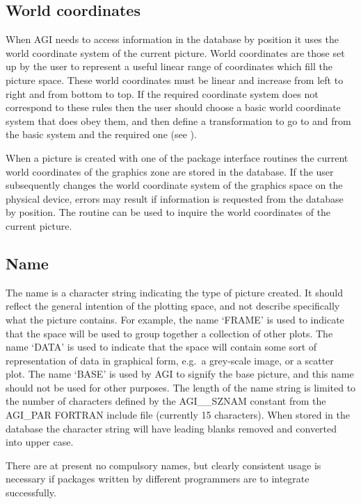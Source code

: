 \documentclass[twoside,11pt,nolof]{starlink}
\begin{document}
\subsection{World coordinates}
When AGI needs to access information in the database by position it uses the
world coordinate system of the current picture.
World coordinates are those set up by the user to represent a useful linear
range of coordinates which fill the picture space.
These world coordinates must be linear and increase from left to right
and from bottom to top. If the required coordinate system does not correspond
to these rules then the user should choose a basic world coordinate system
that does obey them, and then define a transformation to go to and from
the basic system and the required one (see
).

When a picture is created with one of the package interface routines the
current world coordinates of the graphics zone are stored in the database.
If the user subsequently changes the world coordinate system of the graphics
space on the physical device, errors may result if information is requested
from the database by position.
The routine 
can be used to inquire the world coordinates of the current picture.

\subsection{Name}
The name is a character string indicating the type of picture created.
It should reflect the general intention of the plotting space, and not
describe specifically what the picture contains.
For example, the name `FRAME' is used to indicate that the space will be used
to group together a collection of other plots.
The name `DATA' is used to indicate that the space will contain some sort of
representation of data in graphical form, e.g.\ a grey-scale image, or a
scatter plot.
The name `BASE' is used by AGI to signify the base picture, and this name
should not be used for other purposes.
The length of the name string is limited to the number of characters defined
by the AGI\_\_SZNAM constant from the AGI\_PAR FORTRAN include file
(currently 15 characters).
When stored in the database the character string will have leading blanks
removed and converted into upper case.

There are at present no compulsory names, but clearly consistent usage is
necessary if packages written by different programmers are to integrate
successfully.
\end{document}
